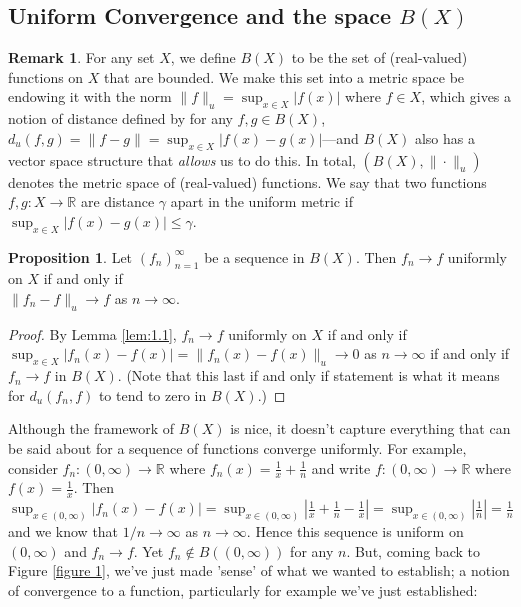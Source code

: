 \documentclass[oneside]{amsart}
\theoremstyle{definition}
\newtheorem{rem}{Remark}[section]
\newtheorem{prop}{Proposition}[section]
\newcommand{\rr}{\mathbb R}
\begin{document}
\subsection{Uniform Convergence and the space $B(X)$}
\begin{rem}
For any set $X$, we define $B(X)$ to be the set of (real-valued) functions on $X$ that are bounded. We make this set into a metric space be endowing it with the norm $\|f\|_u = \sup_{x \in X} |f(x)|$ where $f \in X$, which gives a notion of distance defined by for any $f, g \in B(X)$, $d_u(f,g) =\|f-g\| = \sup_{x \in X} |f(x)-g(x)|$---and $B(X)$ also has a vector space structure that \textit{allows} us to do this. In total, $(B(X), \| \cdot \|_u)$ denotes the metric space of (real-valued) functions. We say that two functions $f,g \colon X \to \rr$ are distance $\gamma$ apart in the uniform metric if $\sup_{x \in X} |f(x) -g(x)|\leq \gamma$.
\end{rem}
\begin{prop} \label{prop: 1.1}
Let $(f_n)_{n=1}^\infty$ be a sequence in $B(X)$. Then $f_n \to f$ uniformly on $X$ if and only if \\ $\|f_n-f\|_u \to f$ as $n \to \infty$.	
\end{prop}
\begin{proof} By Lemma \ref{lem:1.1}, $f_n \to f$ uniformly on $X$ if and only if $\sup_{x \in X}|f_n(x) -f(x)|= \|f_n(x)-f (x)\|_u \to 0$ as $n \to \infty$ if and only if $f_n \to f$ in $B(X)$. (Note that this last if and only if statement is what it means for $d_u(f_n,f)$ to tend to zero in $B(X)$.)
\end{proof}
Although the framework of $B(X)$ is nice, it doesn't capture everything that can be said about for a sequence of functions converge uniformly. For example, consider $f_n \colon (0, \infty) \to \rr$ where $f_n(x) = \frac{1}{x} + \frac{1}{n}$ and write $f \colon (0, \infty) \to \rr$ where $f(x) = \frac{1}{x}$. Then $\sup_{x\in (0,\infty)} |f_n(x) - f(x)| = \sup_{x \in (0,\infty)} | \frac{1}{x}+\frac{1}{n}-\frac{1}{x}| = \sup_{x \in (0, \infty)} |\frac{1}{n}| = \frac{1}{n}$ and we know that $1/n \to \infty$ as $n \to \infty$. Hence this sequence is uniform on $(0,\infty)$ and $f_n \to f$. Yet $f_n \notin B((0,\infty))$ for any $n$. But, coming back to Figure \ref{figure 1}, we've just made 'sense' of what we wanted to establish; a notion of convergence to a function, particularly for example we've just established:
\end{document}
